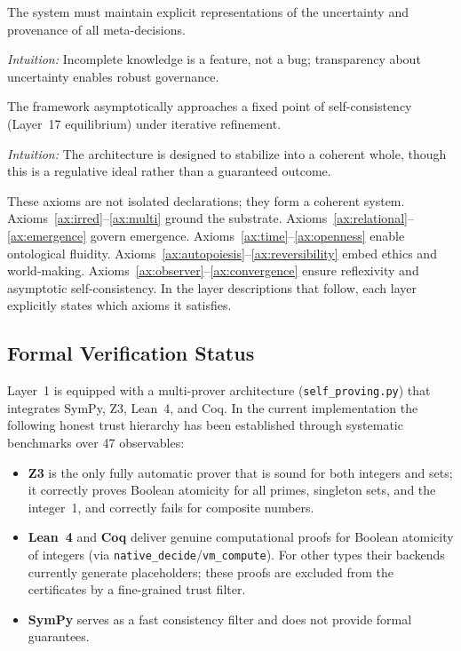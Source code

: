 \begin{axiom}\label{ax:humility}
The system must maintain explicit representations of the uncertainty and provenance of all meta-decisions.
\end{axiom}
\textit{Intuition:} Incomplete knowledge is a feature, not a bug; transparency about uncertainty enables robust governance.

\begin{axiom}[Convergence]\label{ax:convergence}
The framework asymptotically approaches a fixed point of self-consistency (Layer~17 equilibrium) under iterative refinement.
\end{axiom}
\textit{Intuition:} The architecture is designed to stabilize into a coherent whole, though this is a regulative ideal rather than a guaranteed outcome.

These axioms are not isolated declarations; they form a coherent system. Axioms~\ref{ax:irred}--\ref{ax:multi} ground the substrate. Axioms~\ref{ax:relational}--\ref{ax:emergence} govern emergence. Axioms~\ref{ax:time}--\ref{ax:openness} enable ontological fluidity. Axioms~\ref{ax:autopoiesis}--\ref{ax:reversibility} embed ethics and world-making. Axioms~\ref{ax:observer}--\ref{ax:convergence} ensure reflexivity and asymptotic self-consistency. In the layer descriptions that follow, each layer explicitly states which axioms it satisfies.

\subsection{Formal Verification Status}
\label{subsec:formal-verification}

Layer~1 is equipped with a multi-prover architecture
(\texttt{self\_proving.py}) that integrates SymPy, Z3, Lean~4, and
Coq.  In the current implementation the following honest trust
hierarchy has been established through systematic benchmarks over 47
observables:

\begin{itemize}
\item \textbf{Z3} is the only fully automatic prover that is sound for
  both integers and sets; it correctly proves Boolean atomicity for
  all primes, singleton sets, and the integer~1, and correctly fails
  for composite numbers.
\item \textbf{Lean~4} and \textbf{Coq} deliver genuine computational
  proofs for Boolean atomicity of integers (via
  \texttt{native\_decide}/\texttt{vm\_compute}).  For other types
  their backends currently generate placeholders; these proofs are
  excluded from the certificates by a fine-grained trust filter.
\item \textbf{SymPy} serves as a fast consistency filter and does not
  provide formal guarantees.
\end{itemize}

